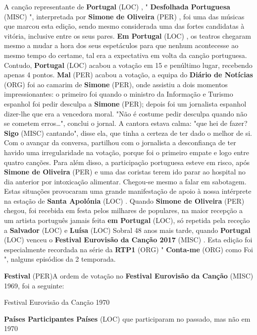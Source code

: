 \documentclass[12pt,a4paper]{article}
\begin{document}
A canção representante de \textbf{Portugal} (LOC) , " \textbf{Desfolhada Portuguesa} (MISC) ", interpretada por \textbf{Simone de Oliveira} (PER) , foi uma das músicas que marcou esta edição, sendo mesmo considerada uma das fortes candidatas à vitória, inclusive entre os seus pares. \textbf{Em Portugal} (LOC) , os teatros chegaram mesmo a mudar a hora dos seus espetáculos para que nenhum acontecesse ao mesmo tempo do certame, tal era a expectativa em volta da canção portuguesa. Contudo, \textbf{Portugal} (LOC) acabou a votação em 15 e penúltimo lugar, recebendo apenas 4 pontos. \textbf{Mal} (PER) acabou a votação, a equipa do \textbf{Diário de Notícias} (ORG) foi ao camarim de \textbf{Simone} (PER), onde assistiu a dois momentos impressionantes: o primeiro foi quando o ministro da Informação e Turismo espanhol foi pedir desculpa a \textbf{Simone} (PER); depois foi um jornalista espanhol dizer-lhe que era a vencedora moral. "Não é costume pedir desculpa quando não se cometem erros…", conclui o jornal. A cantora estava calma: "que hei de fazer? \textbf{Sigo} (MISC) cantando", disse ela, que tinha a certeza de ter dado o melhor de si. Com o avançar da conversa, partilhou com o jornalista a desconfiança de ter havido uma irregularidade na votação, porque foi o primeiro empate e logo entre quatro canções. Para além disso, a participação portuguesa esteve em risco, após \textbf{Simone de Oliveira} (PER) e uma das coristas terem ido parar ao hospital no dia anterior por intoxicação alimentar. Chegou-se mesmo a falar em sabotagem. Estas situações provocaram uma grande manifestação de apoio à nossa intérprete na estação de \textbf{Santa Apolónia} (LOC) . Quando \textbf{Simone de Oliveira} (PER) chegou, foi recebida em festa pelos milhares de populares, na maior recepção a um artista português jamais feita \textbf{em Portugal} (LOC), só repetida pela receção a \textbf{Salvador} (LOC) e \textbf{Luísa} (LOC) Sobral 48 anos mais tarde, quando \textbf{Portugal} (LOC) venceu o \textbf{Festival Eurovisão da Canção 2017} (MISC) . Esta edição foi especialmente recordada na série da \textbf{RTP1} (ORG) " \textbf{Conta-me} (ORG) como Foi ", nalguns episódios da 2 temporada.



\textbf{Festival} (PER)A ordem de votação no \textbf{Festival Eurovisão da Canção} (MISC) 1969, foi a seguinte:



Festival Eurovisão da Canção 1970



\textbf{Países Participantes Países} (LOC) que participaram no passado, mas não em 1970
\end{document}
